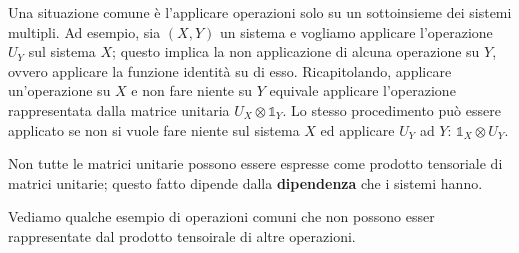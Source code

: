Una situazione comune è l'applicare operazioni solo su un sottoinsieme dei sistemi multipli. Ad esempio, sia $(X,Y)$ un sistema e vogliamo applicare l'operazione $U_Y$ sul sistema $X$; questo implica la non applicazione di alcuna operazione su $Y$, ovvero applicare la funzione identità su di esso. Ricapitolando, applicare un'operazione su $X$ e non fare niente su $Y$ equivale applicare l'operazione rappresentata dalla matrice unitaria $U_X \otimes \mathbb{1}_Y$. Lo stesso procedimento può essere applicato se non si vuole fare niente sul sistema $X$ ed applicare $U_Y$ ad $Y$: $\mathbb{1}_X \otimes U_Y$.

\begin{oss}{}{}
Non tutte le matrici unitarie possono essere espresse come prodotto tensoriale di matrici unitarie; questo fatto dipende dalla \textbf{dipendenza} che i sistemi hanno.
\end{oss}
Vediamo qualche esempio di operazioni comuni che non possono esser rappresentate dal prodotto tensoirale di altre operazioni.
